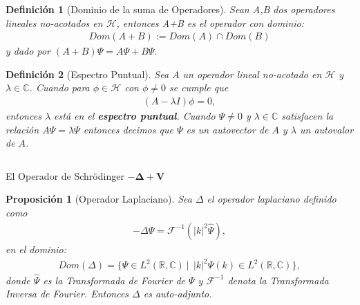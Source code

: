 \documentclass[aspectratio=1610]{beamer}
\newcommand*{\field}[1]{\mathbb{#1}}
\newtheorem*{defn}{Definición}
\newtheorem*{prop}{Proposición}
\begin{document}
\begin{frame}{}

\begin{defn}[Dominio de la suma de Operadores]
    Sean A,B dos operadores lineales no-acotados en $\mathcal{H}$, entonces A+B es el operador con dominio:
    \begin{align}
        Dom(A+B) := Dom(A)\cap Dom(B)
        \label{eq:SumadeOperadores}
    \end{align}
    y dado por $(A+B)\Psi = A\Psi + B\Psi$.
    \label{def:DomOPADJS}
\end{defn}
\begin{defn}[Espectro Puntual]
    Sea $A$ un operador lineal no-acotado en $\mathcal{H}$ y $\lambda\in\field{C}$. Cuando para $\phi\in\mathcal{H}$ con $\phi\neq0$ se cumple que 
    \begin{align*}
        (A-\lambda I)\phi = 0,
    \end{align*}
    entonces $\lambda$ está en el \textbf{espectro puntual}. Cuando $\Psi\neq 0$ y $\lambda\in\field{C}$ satisfacen la relación $A\Psi = \lambda\Psi$ entonces decimos que $\Psi$ es un autovector de $A$ y $\lambda$ un autovalor de $A$.
\end{defn}

\begin{columns}
\column{37em}
\end{columns}
\end{frame}



\begin{frame}{El Operador de Schrödinger $\boldsymbol{-\Delta + V}$}

\begin{prop}[Operador Laplaciano]
    Sea $\Delta$ el operador laplaciano definido como
    \begin{align*}
        -\Delta\Psi = \mathcal{F}^{-1}(|k|^{2} \hat{\Psi}),
    \end{align*}
    en el dominio:
    \begin{align*} Dom(\Delta) = \{\Psi\in L^{2}(\field{R},\field{C}) \:|\:
       \: |k|^{2}\hat{\Psi}(k) \in L^{2}(\field{R},\field{C})\},
    \end{align*}
donde $\hat{\Psi}$ es la Transformada de Fourier de $\Psi$ y $\mathcal{F}^{-1}$ denota la Transformada Inversa de Fourier. Entonces $\Delta$ es auto-adjunto.
\end{prop}    
    
\end{frame}
\end{document}
